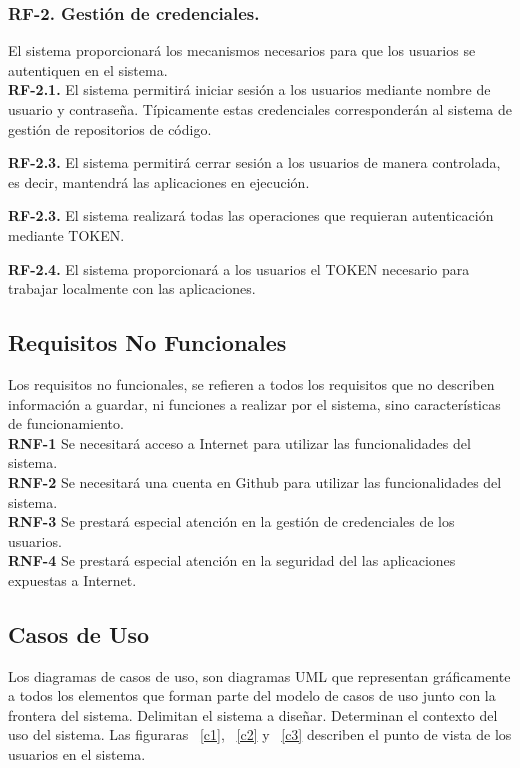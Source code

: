 \documentclass[a4paper,11pt]{book}
\begin{document}
\subsubsection { \textbf{ RF-2. Gestión de credenciales.}} El sistema proporcionará los mecanismos necesarios para que los usuarios se autentiquen en el sistema. \\


\textbf{RF-2.1.} El sistema  permitirá iniciar sesión  a los usuarios mediante nombre de usuario y contraseña. Típicamente estas credenciales corresponderán al sistema de gestión de repositorios de código.

\textbf{RF-2.3.} El sistema  permitirá cerrar sesión a los usuarios de manera controlada, es decir, mantendrá las aplicaciones en ejecución.

\textbf{RF-2.3.} El sistema  realizará todas las operaciones que requieran autenticación mediante TOKEN.

\textbf{RF-2.4.} El sistema  proporcionará a los usuarios el TOKEN necesario para trabajar localmente con las aplicaciones.


\subsection{Requisitos No Funcionales }
Los requisitos no funcionales, se refieren a todos los requisitos que no describen información a guardar, ni funciones a realizar por el sistema, sino características de funcionamiento.\\


\textbf{RNF-1} Se necesitará acceso a Internet para utilizar las funcionalidades del sistema.\\

\textbf{RNF-2} Se necesitará una cuenta en Github para utilizar las funcionalidades del sistema.\\

\textbf{RNF-3} Se prestará especial atención en la gestión de credenciales de los usuarios.\\

\textbf{RNF-4} Se prestará especial atención en la seguridad del  las aplicaciones expuestas a Internet.

\subsection{Casos de Uso}
Los diagramas de casos de uso, son diagramas UML que representan gráficamente a todos los elementos que forman parte del modelo de casos de uso junto con la frontera del sistema. Delimitan el sistema a diseñar. Determinan el contexto del uso del sistema. Las figuraras ~\ref{c1}, ~\ref{c2}  y ~\ref{c3} describen el punto de vista de los usuarios  en el sistema.
\end{document}
